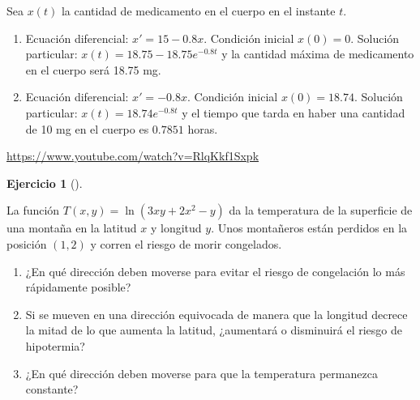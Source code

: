 \documentclass[
  a4paper,
]{scrreport}
\theoremstyle{definition}
\newtheorem{exercise}{Ejercicio}[chapter]
\theoremstyle{remark}
\begin{document}
\begin{tcolorbox}[enhanced jigsaw, opacitybacktitle=0.6, titlerule=0mm, bottomtitle=1mm, toptitle=1mm, breakable, bottomrule=.15mm, left=2mm, opacityback=0, toprule=.15mm, leftrule=.75mm, colframe=quarto-callout-tip-color-frame, coltitle=black, rightrule=.15mm, colback=white, title=\textcolor{quarto-callout-tip-color}{\faLightbulb}\hspace{0.5em}{Solución}, arc=.35mm, colbacktitle=quarto-callout-tip-color!10!white]

Sea \(x(t)\) la cantidad de medicamento en el cuerpo en el instante
\(t\).

\begin{enumerate}
\def\labelenumi{\arabic{enumi}.}
\item
  Ecuación diferencial: \(x'=15-0.8x\). Condición inicial \(x(0)=0\).
  Solución particular: \(x(t)=18.75-18.75e^{-0.8t}\) y la cantidad
  máxima de medicamento en el cuerpo será 18.75 mg.
\item
  Ecuación diferencial: \(x'=-0.8x\). Condición inicial \(x(0)=18.74\).
  Solución particular: \(x(t)=18.74e^{-0.8t}\) y el tiempo que tarda en
  haber una cantidad de 10 mg en el cuerpo es \(0.7851\) horas.
\end{enumerate}

\end{tcolorbox}

\begin{tcolorbox}[enhanced jigsaw, opacitybacktitle=0.6, titlerule=0mm, bottomtitle=1mm, toptitle=1mm, breakable, bottomrule=.15mm, left=2mm, opacityback=0, toprule=.15mm, leftrule=.75mm, colframe=quarto-callout-note-color-frame, coltitle=black, rightrule=.15mm, colback=white, title=\textcolor{quarto-callout-note-color}{\faInfo}\hspace{0.5em}{Resolución}, arc=.35mm, colbacktitle=quarto-callout-note-color!10!white]

\url{https://www.youtube.com/watch?v=RlqKkf1Sxpk}

\end{tcolorbox}

\begin{exercise}[]\protect\hypertarget{exr-2}{}\label{exr-2}

La función \(T(x,y)=\ln(3xy+2x^2-y)\) da la temperatura de la superficie
de una montaña en la latitud \(x\) y longitud \(y\). Unos montañeros
están perdidos en la posición \((1,2)\) y corren el riesgo de morir
congelados.

\begin{enumerate}
\def\labelenumi{\arabic{enumi}.}
\item
  ¿En qué dirección deben moverse para evitar el riesgo de congelación
  lo más rápidamente posible?
\item
  Si se mueven en una dirección equivocada de manera que la longitud
  decrece la mitad de lo que aumenta la latitud, ¿aumentará o disminuirá
  el riesgo de hipotermia?
\item
  ¿En qué dirección deben moverse para que la temperatura permanezca
  constante?
\end{enumerate}

\end{exercise}
\end{document}
